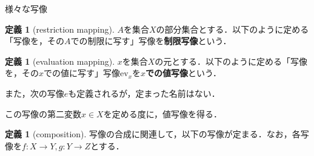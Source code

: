 \documentclass[uplatex, 12pt, dvipdfmx]{jsreport}
\theoremstyle{definition}
\newtheorem{definition}[theorem]{定義}
\theoremstyle{StatementsWithStar}
\theoremstyle{StatementsWithStar2}
\theoremstyle{StatementsWithStar3}
\theoremstyle{StatementsWithCCirc}
\theoremstyle{definition}
\begin{document}
\begin{itembox}[l]{様々な写像}
	\begin{definition}[restriction mapping]
		$A$を集合$X$の部分集合とする．以下のように定める「写像を，その$A$での制限に写す」写像を\textbf{制限写像}という．
		\begin{center}\end{center}
	\end{definition}
	\begin{definition}[evaluation mapping]
		$x$を集合$X$の元とする．以下のように定める「写像を，その$x$での値に写す」写像$\mathrm{ev}_x$を\textbf{$x$での値写像}という．
		\begin{center}\end{center}
		また，次の写像$e$も定義されるが，定まった名前はない．
		\begin{center}\end{center}
		この写像の第二変数$x\in X$を定める度に，値写像を得る．
	\end{definition}
	\begin{definition}[composition]
		写像の合成に関連して，以下の写像が定まる．なお，各写像を$f:X\to Y, g:Y\to Z$とする．
		\begin{center}\end{center}

\end{definition}
\end{itembox}
\end{document}
